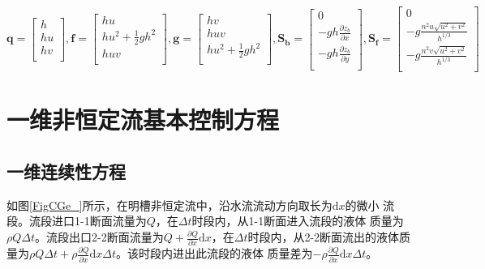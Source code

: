 \begin{equation}
  \mathbf{q} =
  \begin{bmatrix}
    h \\
    hu \\
    hv \\
  \end{bmatrix}
  ,
  \mathbf{f} =
  \begin{bmatrix}
    hu \\
    hu^{2} + \frac{1}{2}gh^{2} \\
    huv \\
  \end{bmatrix}
  ,
  \mathbf{g} =
  \begin{bmatrix}
    hv \\
    huv \\
    hu^{2} + \frac{1}{2}gh^{2} \\
  \end{bmatrix}
  ,
  \mathbf{S_{b}} =
  \begin{bmatrix}
    0 \\
    -gh\frac{\partial z_{b}}{\partial x} \\
    -gh\frac{\partial z_{b}}{\partial y} \\
  \end{bmatrix}
  ,
  \mathbf{S_{f}} =
  \begin{bmatrix}
    0 \\
    -g\frac{n^{2}u\sqrt{u^2+v^2}}{h^{1/3}} \\
    -g\frac{n^{2}v\sqrt{u^2+v^2}}{h^{1/3}} \\
  \end{bmatrix}
\end{equation}


\section{一维非恒定流基本控制方程}
\subsection{一维连续性方程}
如图\ref{FigCGe_}所示，在明槽非恒定流中，沿水流流动方向取长为$\mathrm{d}x$的微小
流段。流段进口1-1断面流量为$Q$，在$\Delta t$时段内，从1-1断面进入流段的液体
质量为$\rho Q\Delta t$。流段出口2-2断面流量为$Q+\frac{\partial Q}{\partial
x}\mathrm{d}x$，在$\Delta t$时段内，从2-2断面流出的液体质量为$\rho Q\Delta
t+\rho\frac{\partial Q}{\partial x}\mathrm{d}x\Delta t$。该时段内进出此流段的液体
质量差为$-\rho\frac{\partial Q}{\partial x}\mathrm{d}x\Delta t$。

